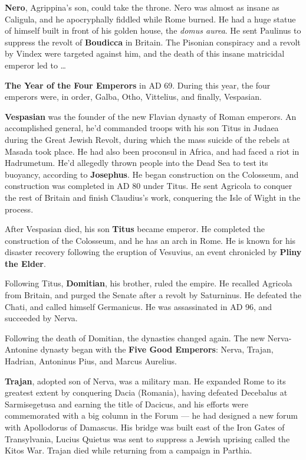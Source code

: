 \textbf{Nero}, Agrippina's son, could take the throne.
Nero was almost as insane as Caligula, and he apocryphally fiddled while Rome burned.
He had a huge statue of himself built in front of his golden house, the \textit{domus aurea}.
He sent Paulinus to suppress the revolt of \textbf{Boudicca} in Britain.
The Pisonian conspiracy and a revolt by Vindex were targeted against him,
and the death of this insane matricidal emperor led to \ldots

\textbf{The Year of the Four Emperors} in AD 69. During this year, the four emperors were, in order,
Galba, Otho, Vittelius, and finally, Vespasian.

\textbf{Vespasian} was the founder of the new Flavian dynasty of Roman emperors.
An accomplished general, he'd commanded troops with his son Titus in Judaea during the Great Jewish Revolt,
during which the mass suicide of the rebels at Masada took place.
He had also been proconsul in Africa, and had faced a riot in Hadrumetum.
He'd allegedly thrown people into the Dead Sea to test its buoyancy, according to \textbf{Josephus}.
He began construction on the Colosseum, and construction was completed in AD 80 under Titus.
He sent Agricola to conquer the rest of Britain and finish Claudius's work,
conquering the Isle of Wight in the process.

After Vespasian died, his son \textbf{Titus} became emperor.
He completed the construction of the Colosseum, and he has an arch in Rome.
He is known for his disaster recovery following the eruption of Vesuvius,
an event chronicled by \textbf{Pliny the Elder}.

Following Titus, \textbf{Domitian}, his brother, ruled the empire.
He recalled Agricola from Britain, and purged the Senate after a revolt by Saturninus.
He defeated the Chati, and called himself Germanicus.
He was assassinated in AD 96, and succeeded by Nerva.

Following the death of Domitian, the dynasties changed again.
The new Nerva-Antonine dynasty began with the \textbf{Five Good Emperors}:
Nerva, Trajan, Hadrian, Antoninus Pius, and Marcus Aurelius.

\textbf{Trajan}, adopted son of Nerva, was a military man.
He expanded Rome to its greatest extent by conquering Dacia (Romania),
having defeated Decebalus at Sarmisegetusa and earning the title of Dacicus,
and his efforts were commemorated with a big column in the Forum ---
he had designed a new forum with Apollodorus of Damascus.
His bridge was built east of the Iron Gates of Transylvania,
Lucius Quietus was sent to suppress a Jewish uprising called the Kitos War.
Trajan died while returning from a campaign in Parthia.

